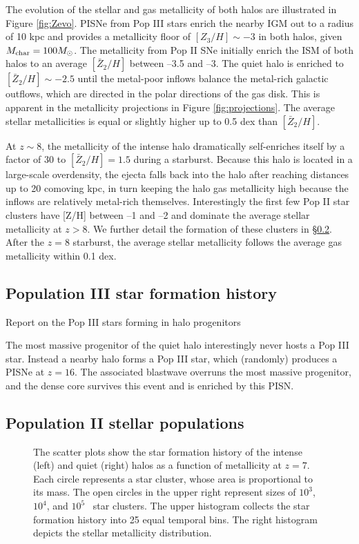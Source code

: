 \documentclass[apjl]{emulateapj}
\begin{document}
The evolution of the stellar and gas metallicity of both halos are
illustrated in Figure \ref{fig:Zevo}.  PISNe from Pop III stars enrich
the nearby IGM out to a radius of 10 kpc and provides a metallicity
floor of $[Z_3/H] \sim -3$ in both halos, given $M_{\rm char} = 100
\Ms$.  The metallicity from Pop II SNe initially enrich the ISM of
both halos to an average $[\bar{Z}_2/H]$ between --3.5 and --3.  The
quiet halo is enriched to $[\bar{Z}_2/H] \sim -2.5$ until the
metal-poor inflows balance the metal-rich galactic outflows, which are
directed in the polar directions of the gas disk.  This is apparent in
the metallicity projections in Figure \ref{fig:projections}.  The
average stellar metallicities is equal or slightly higher up to 0.5
dex than $[\bar{Z}_2/H]$.

At $z \sim 8$, the metallicity of the intense halo dramatically
self-enriches itself by a factor of 30 to $[\bar{Z}_2/H] = 1.5$ during
a starburst.  Because this halo is located in a large-scale
overdensity, the ejecta falls back into the halo after reaching
distances up to 20 comoving kpc, in turn keeping the halo gas
metallicity high because the inflows are relatively metal-rich
themselves.  Interestingly the first few Pop II star clusters have
[Z/H] between --1 and --2 and dominate the average stellar metallicity
at $z > 8$.  We further detail the formation of these clusters in
\S\ref{sec:pop}.  After the $z=8$ starburst, the average stellar
metallicity follows the average gas metallicity within 0.1 dex.

\subsection{Population III star formation history}

\li Report on the Pop III stars forming in halo progenitors

The most massive progenitor of the quiet halo interestingly never
hosts a Pop III star.  Instead a nearby halo forms a Pop III star,
which (randomly) produces a PISNe at $z=16$.  The associated blastwave
overruns the most massive progenitor, and the dense core survives this
event and is enriched by this PISN.

\subsection{Population II stellar populations}
\label{sec:pop}

\begin{figure*}
  \caption{\label{fig:pops} The scatter plots show the star formation
    history of the intense (left) and quiet (right) halos as a
    function of metallicity at $z=7$.  Each circle represents a star
    cluster, whose area is proportional to its mass.  The open circles
    in the upper right represent sizes of $10^3$, $10^4$, and $10^5$
    \Ms~star clusters.  The upper histogram collects the star formation
    history into 25 equal temporal bins.  The right histogram depicts
    the stellar metallicity distribution.}
\end{figure*}
\end{document}

